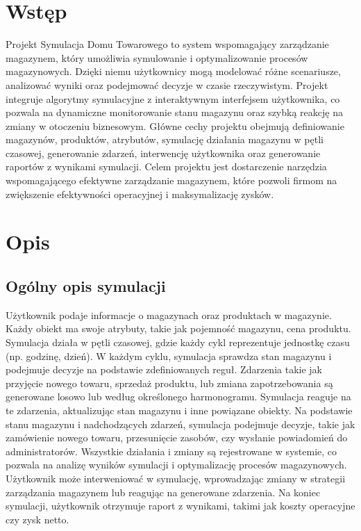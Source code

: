 \documentclass[11pt]{article}
\begin{document}
\newpage




\section{Wstęp}

Projekt Symulacja Domu Towarowego to system wspomagający zarządzanie magazynem, który umożliwia symulowanie i optymalizowanie procesów magazynowych. Dzięki niemu użytkownicy mogą modelować różne scenariusze, analizować wyniki oraz podejmować decyzje w czasie rzeczywistym. Projekt integruje algorytmy symulacyjne z interaktywnym interfejsem użytkownika, co pozwala na dynamiczne monitorowanie stanu magazynu oraz szybką reakcję na zmiany w otoczeniu biznesowym. Główne cechy projektu obejmują definiowanie magazynów, produktów, atrybutów, symulację działania magazynu w pętli czasowej, generowanie zdarzeń, interwencję użytkownika oraz generowanie raportów z wynikami symulacji. Celem projektu jest dostarczenie narzędzia wspomagającego efektywne zarządzanie magazynem, które pozwoli firmom na zwiększenie efektywności operacyjnej i maksymalizację zysków.

\section{Opis}

\subsection{Ogólny opis symulacji}
Użytkownik podaje informacje o magazynach oraz produktach w magazynie. Każdy obiekt ma swoje atrybuty, takie jak pojemność magazynu, cena produktu. Symulacja działa w pętli czasowej, gdzie każdy cykl reprezentuje jednostkę czasu (np. godzinę, dzień). W każdym cyklu, symulacja sprawdza stan magazynu i podejmuje decyzje na podstawie zdefiniowanych reguł. Zdarzenia takie jak przyjęcie nowego towaru, sprzedaż produktu, lub zmiana zapotrzebowania są generowane losowo lub według określonego harmonogramu. Symulacja reaguje na te zdarzenia, aktualizując stan magazynu i inne powiązane obiekty. Na podstawie stanu magazynu i nadchodzących zdarzeń, symulacja podejmuje decyzje, takie jak zamówienie nowego towaru, przesunięcie zasobów, czy wysłanie powiadomień do administratorów. Wszystkie działania i zmiany są rejestrowane w systemie, co pozwala na analizę wyników symulacji i optymalizację procesów magazynowych. Użytkownik może interweniować w symulację, wprowadzając zmiany w strategii zarządzania magazynem lub reagując na generowane zdarzenia.
Na koniec symulacji, użytkownik otrzymuje raport z wynikami, takimi jak koszty operacyjne czy zysk netto.
\end{document}
